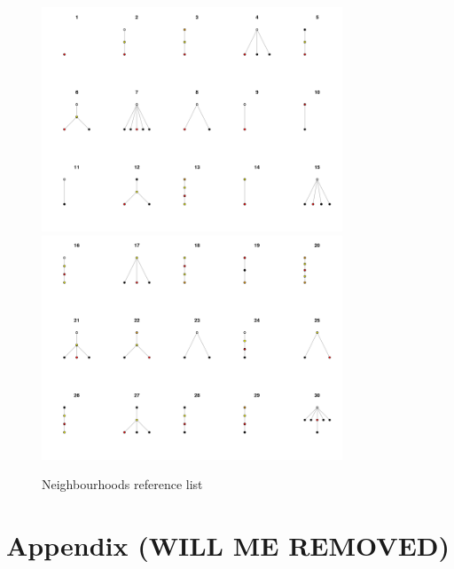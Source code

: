 \documentclass[conference]{IEEEtran}
\begin{document}
\begin{figure}
	\centering
	\includegraphics[width=0.8\textwidth]{dictionary1}
	\includegraphics[width=0.8\textwidth]{dictionary2}
	\caption{Neighbourhoods reference list}
	\label{fig:dictionary}
\end{figure}







\newpage
\section*{Appendix  (WILL ME REMOVED)}
\end{document}
